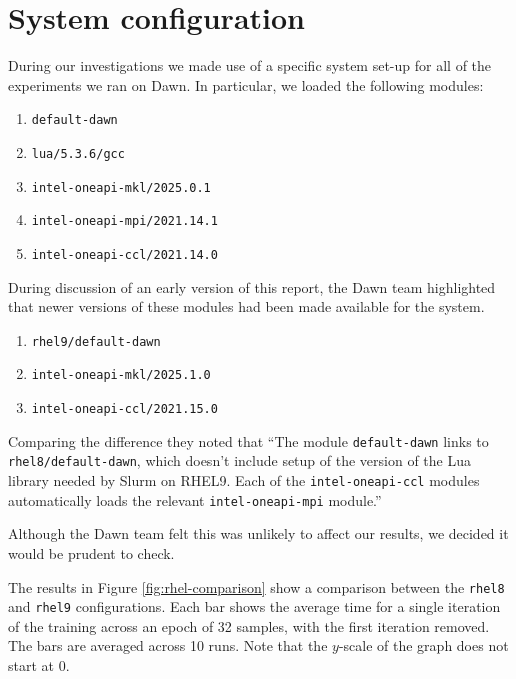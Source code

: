 \printbibliography

\newpage
\appendix

\appendixpage

\section{System configuration}
\label{appendix:rhel}

During our investigations we made use of a specific system set-up for all of the experiments we ran on Dawn. In particular, we loaded the following modules:

\begin{enumerate}
    \item {\tt default-dawn}
    \item {\tt lua/5.3.6/gcc}
    \item {\tt intel-oneapi-mkl/2025.0.1}
    \item {\tt intel-oneapi-mpi/2021.14.1}
    \item {\tt intel-oneapi-ccl/2021.14.0}
\end{enumerate}

During discussion of an early version of this report, the Dawn team highlighted that newer versions of these modules had been made available for the system.

\begin{enumerate}
    \item {\tt rhel9/default-dawn}
    \item {\tt intel-oneapi-mkl/2025.1.0}
    \item {\tt intel-oneapi-ccl/2021.15.0}
\end{enumerate}

Comparing the difference they noted that ``The module {\tt default-dawn} links to {\tt rhel8/default-dawn}, which doesn't include setup of the version of the Lua library needed by Slurm on RHEL9.  Each of the {\tt intel-oneapi-ccl} modules automatically loads the relevant {\tt intel-oneapi-mpi} module.''

Although the Dawn team felt this was unlikely to affect our results, we decided it would be prudent to check.

The results in Figure \ref{fig:rhel-comparison} show a comparison between the {\tt rhel8} and {\tt rhel9} configurations. Each bar shows the average time for a single iteration of the training across an epoch of 32 samples, with the first iteration removed. The bars are averaged across 10 runs. Note that the $y$-scale of the graph does not start at 0.

